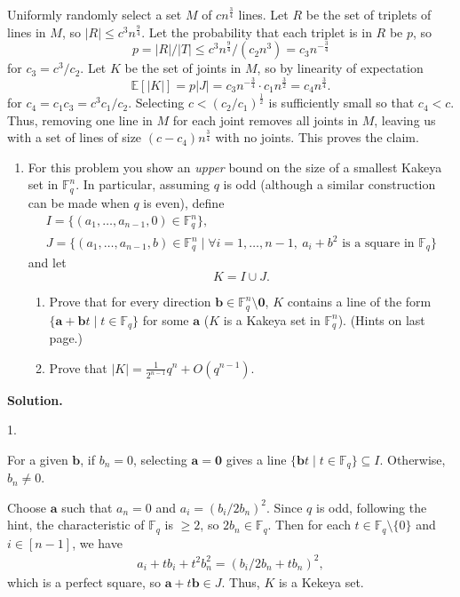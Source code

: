 \documentclass[11pt,letterpaper]{article}
\theoremstyle{definition}
\newcommand{\bfa}{\mathbf{a}}
\newcommand{\bfb}{\mathbf{b}}
\newcommand{\EE}{\mathbb{E}}
\newcommand{\solution}{\medskip\noindent\textbf{Solution.}\par\medskip}
\begin{document}
Uniformly randomly select a set $M$ of $cn^\frac{3}{4}$ lines.
Let $R$ be the set of triplets of lines in $M$, so $|R|\leq c^3n^\frac{9}{4}$.
Let the probability that each triplet is in $R$ be $p$, so
\[
    p = |R|/|T| \leq c^3n^\frac{9}{4}/(c_2n^3)=c_3n^{-\frac{3}{4}}
\]
for $c_3=c^3/c_2$.
Let $K$ be the set of joints in $M$, so by linearity of expectation
\[
    \EE[|K|] = p |J| = c_3n^{-\frac{3}{4}}\cdot c_1n^\frac{3}{2} = c_4 n^\frac{3}{4}.
\]
for $c_4=c_1c_3=c^3c_1/c_2$. Selecting $c<(c_2/c_1)^\frac{1}{2}$ is sufficiently small so that $c_4<c$.
Thus, removing one line in $M$ for each joint removes all joints in $M$, leaving us with a set of lines of size $(c-c_4)n^\frac{3}{4}$ with no joints.
This proves the claim.

\begin{enumerate}[resume=q]
\item For this problem you show an \emph{upper} bound on the size of a smallest Kakeya set in $\mathbb{F}_q^n$. In particular, assuming $q$ is odd (although a similar construction can be made when $q$ is even), define
\begin{gather*}
I = \{(a_1,\dots,a_{n-1},0) \in \mathbb{F}_q^n\},\\
J = \{(a_1,\dots,a_{n-1},b) \in \mathbb{F}_q^n \mid \forall i = 1,\dots,n-1,\ a_i + b^2 \text{ is a square in } \mathbb{F}_q\}
\end{gather*}
and let
\[
K = I \cup J.
\]
\begin{enumerate}[label=\arabic*.]
\item Prove that for every direction $\mathbf{b} \in \mathbb{F}_q^n \setminus \mathbf{0}$, $K$ contains a line of the form $\{\mathbf{a} + \mathbf{b}t \mid t \in \mathbb{F}_q\}$ for some $\mathbf{a}$ ($K$ is a Kakeya set in $\mathbb{F}_q^n$). (Hints on last page.)
\item Prove that $|K| = \frac{1}{2^{n-1}} q^n + O(q^{n-1})$.
\end{enumerate}
\end{enumerate}

\solution

1.

For a given $\bfb$, if $b_n=0$, selecting $\bfa = \mathbf{0}$ gives a line $\{\mathbf{b}t \mid t \in \mathbb{F}_q\}\subseteq I$.
Otherwise, $b_n\neq 0$.

Choose $\bfa$ such that $a_n=0$ and $a_i = (b_i/2b_n)^2$.
Since $q$ is odd, following the hint, the characteristic of $\mathbb{F}_q$ is $\geq 2$, so $2b_n\in \mathbb{F}_q$.
Then for each $t\in \mathbb{F}_q\setminus \{0\}$ and $i\in [n-1]$, we have 
\begin{align*}
    a_i + tb_i +t^2 b_n^2 = (b_i/2b_n + tb_n)^2,
\end{align*}
which is a perfect square, so $\bfa + t\bfb\in J$. Thus, $K$ is a Kekeya set.
\end{document}
